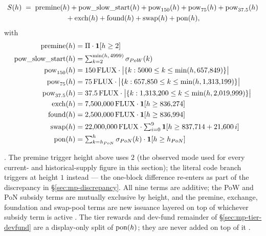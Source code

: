 \begin{definition}
\label{def:supply}
\begin{multline*}
S(h) \;=\; \mathrm{premine}(h) + \mathrm{pow\_slow\_start}(h)
  + \mathrm{pow}_{150}(h) + \mathrm{pow}_{75}(h) + \mathrm{pow}_{37.5}(h) \\
  {}+ \mathrm{exch}(h) + \mathrm{found}(h) + \mathrm{swap}(h) + \mathrm{pon}(h),
\end{multline*}
with
\begin{align*}
\mathrm{premine}(h) &= \Pi \cdot \mathbf{1}\!\left[h \ge 2\right] \\
\mathrm{pow\_slow\_start}(h) &= \textstyle\sum_{k=2}^{\min(h,\,4999)} \sigma_{PoW}(k) \\
\mathrm{pow}_{150}(h) &= 150\,\mathrm{FLUX} \cdot \big|\{k : 5000 \le k \le \min(h,657{,}849)\}\big| \\
\mathrm{pow}_{75}(h) &= 75\,\mathrm{FLUX} \cdot \big|\{k : 657{,}850 \le k \le \min(h,1{,}313{,}199)\}\big| \\
\mathrm{pow}_{37.5}(h) &= 37.5\,\mathrm{FLUX} \cdot \big|\{k : 1{,}313{,}200 \le k \le \min(h,2{,}019{,}999)\}\big| \\
\mathrm{exch}(h) &= 7{,}500{,}000\,\mathrm{FLUX} \cdot \mathbf{1}\!\left[h \ge 836{,}274\right] \\
\mathrm{found}(h) &= 2{,}500{,}000\,\mathrm{FLUX} \cdot \mathbf{1}\!\left[h \ge 836{,}994\right] \\
\mathrm{swap}(h) &= 22{,}000{,}000\,\mathrm{FLUX} \cdot \textstyle\sum_{i=0}^{9} \mathbf{1}\!\left[h \ge 837{,}714 + 21{,}600\,i\right] \\
\mathrm{pon}(h) &= \textstyle\sum_{k=h_{PoN}}^{h} \sigma_{PoN}(k) \cdot \mathbf{1}\!\left[h \ge h_{PoN}\right]
\end{align*}
\end{definition}
\shipped {}. The premine trigger height
above uses $2$ (the observed mode used for every current- and historical-supply figure in this
section); the literal code branch triggers at height $1$ instead
\shipped {} — the one-block difference re-enters as part of
the discrepancy in \S\ref{sec:mp-discrepancy}. All nine terms are additive; the PoW and PoN
subsidy terms are mutually exclusive by height, and the premine, exchange, foundation and
swap-pool terms are new issuance layered on top of whichever subsidy term is active
\shipped {}. The tier rewards and dev-fund
remainder of \S\ref{sec:mp-tier-devfund} are a display-only split of $\mathrm{pon}(h)$; they are
never added on top of it \shipped {}.

